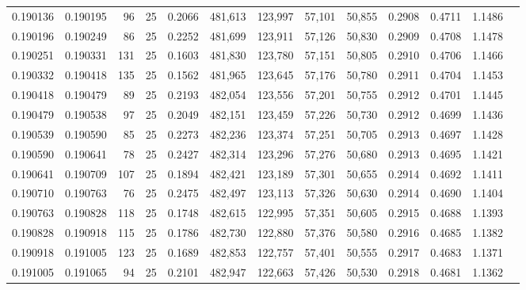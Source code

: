\begin{tabular}{rrrrrrrrrrrrr}
0.190136 & 0.190195 &    96 &  25 &                                     0.2066 & 481,613 & 123,997 &  57,101 &  50,855 & 0.2908 & 0.4711 & 1.1486 \\
0.190196 & 0.190249 &    86 &  25 &                                     0.2252 & 481,699 & 123,911 &  57,126 &  50,830 & 0.2909 & 0.4708 & 1.1478 \\
0.190251 & 0.190331 &   131 &  25 &                                     0.1603 & 481,830 & 123,780 &  57,151 &  50,805 & 0.2910 & 0.4706 & 1.1466 \\
0.190332 & 0.190418 &   135 &  25 &                                     0.1562 & 481,965 & 123,645 &  57,176 &  50,780 & 0.2911 & 0.4704 & 1.1453 \\
0.190418 & 0.190479 &    89 &  25 &                                     0.2193 & 482,054 & 123,556 &  57,201 &  50,755 & 0.2912 & 0.4701 & 1.1445 \\
0.190479 & 0.190538 &    97 &  25 &                                     0.2049 & 482,151 & 123,459 &  57,226 &  50,730 & 0.2912 & 0.4699 & 1.1436 \\
0.190539 & 0.190590 &    85 &  25 &                                     0.2273 & 482,236 & 123,374 &  57,251 &  50,705 & 0.2913 & 0.4697 & 1.1428 \\
0.190590 & 0.190641 &    78 &  25 &                                     0.2427 & 482,314 & 123,296 &  57,276 &  50,680 & 0.2913 & 0.4695 & 1.1421 \\
0.190641 & 0.190709 &   107 &  25 &                                     0.1894 & 482,421 & 123,189 &  57,301 &  50,655 & 0.2914 & 0.4692 & 1.1411 \\
0.190710 & 0.190763 &    76 &  25 &                                     0.2475 & 482,497 & 123,113 &  57,326 &  50,630 & 0.2914 & 0.4690 & 1.1404 \\
0.190763 & 0.190828 &   118 &  25 &                                     0.1748 & 482,615 & 122,995 &  57,351 &  50,605 & 0.2915 & 0.4688 & 1.1393 \\
0.190828 & 0.190918 &   115 &  25 &                                     0.1786 & 482,730 & 122,880 &  57,376 &  50,580 & 0.2916 & 0.4685 & 1.1382 \\
0.190918 & 0.191005 &   123 &  25 &                                     0.1689 & 482,853 & 122,757 &  57,401 &  50,555 & 0.2917 & 0.4683 & 1.1371 \\
0.191005 & 0.191065 &    94 &  25 &                                     0.2101 & 482,947 & 122,663 &  57,426 &  50,530 & 0.2918 & 0.4681 & 1.1362 \\

\end{tabular}
